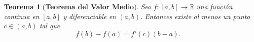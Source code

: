 \documentclass[12pt]{article}
\theoremstyle{plain}
\newtheorem{teorema}{Teorema}[section] %
\theoremstyle{definition}
\numberwithin{equation}{section}
\begin{document}
\begin{teorema}[\textbf{Teorema del Valor Medio}]
    \label{TVM}
    Sea $f \colon [a,b] \to \mathbb{R}$ una función continua en $[a,b]$ y diferenciable en $(a,b)$. Entonces existe al menos un punto $c \in (a,b)$ tal que
    \begin{equation*}
        f(b) - f(a) = f'(c)(b - a). 
    \end{equation*}
\end{teorema}
\newpage
\clearpage
{}
{}
\nocite{*}
 

\end{document}
